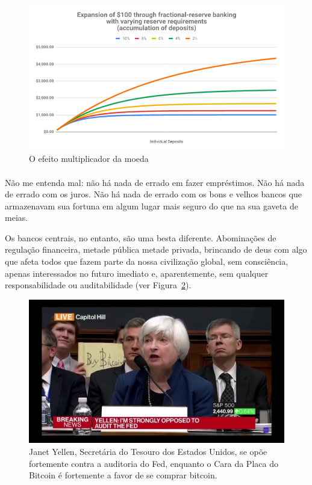 \begin{figure}
  \centering
  \includegraphics{assets/images/money-multiplier.png}
  \caption{O efeito multiplicador da moeda}
  \label{fig:money-multiplier}
\end{figure}

\paragraph{}
Não me entenda mal: não há nada de errado em fazer empréstimos. Não há nada de errado com os juros. Não há nada de errado com os bons e velhos bancos que armazenavam sua fortuna em algum lugar mais seguro do que na sua gaveta de meias.

Os bancos centrais, no entanto, são uma besta diferente. Abominações de regulação financeira, metade pública metade privada, brincando de deus com algo que afeta todos que fazem parte da nossa civilização global, sem consciência, apenas interessados no futuro imediato e, aparentemente, sem qualquer responsabilidade ou auditabilidade (ver Figura~\ref{fig:bsg}).

\begin{figure}
  \centering
  \includegraphics{assets/images/bsg.jpg}
  \caption{Janet Yellen, Secretária do Tesouro dos Estados Unidos, se opõe fortemente contra a auditoria do Fed, enquanto o Cara da Placa do Bitcoin é fortemente a favor de se comprar bitcoin.}
  \label{fig:bsg}
\end{figure}


